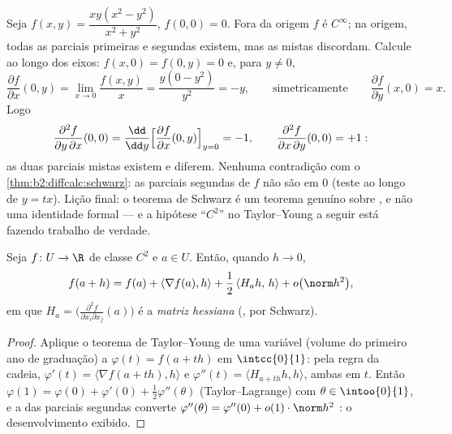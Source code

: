 \begin{example}\label{ex:b2:diffcalc:peano}
Seja $f(x, y) = \dfrac{xy(x^2 - y^2)}{x^2 + y^2}$, $f(0,0) = 0$.
Fora da origem $f$ é $C^\infty$; na origem, todas as parciais primeiras
e segundas existem, mas as mistas discordam. Calcule
ao longo dos eixos: $f(x, 0) = f(0, y) = 0$ e, para $y \neq 0$,
\[
\frac{\partial f}{\partial x}(0, y)
= \lim_{x\to0}\frac{f(x,y)}{x}
= \frac{y(0 - y^2)}{y^2} = -y ,
\qquad\text{simetricamente}\qquad
\frac{\partial f}{\partial y}(x, 0) = x .
\]
Logo
\[
\frac{\partial^2 f}{\partial y\,\partial x}(0,0)
= \frac{\dd}{\dd y}\Bigl[\frac{\partial f}{\partial
x}(0,y)\Bigr]_{y=0} = -1,
\qquad
\frac{\partial^2 f}{\partial x\,\partial y}(0,0) = +1 :
\]
as duas parciais mistas existem e diferem. Nenhuma contradição com o
\cref{thm:b2:diffcalc:schwarz}: as parciais segundas de $f$ não são
 em $0$ (teste ao longo de $y = tx$). Lição final:
o teorema de Schwarz é um teorema genuíno sobre \emph{},
e não uma identidade formal --- e a hipótese ``$C^2$'' no
Taylor--Young a seguir está fazendo trabalho de verdade.
\end{example}

\begin{theorem}\label{thm:b2:diffcalc:taylor}
Seja $f \colon U \to \R$ de classe $C^2$ e $a \in U$. Então, quando $h \to 0$,
\[
f(a + h) = f(a) + \langle\nabla f(a), h\rangle
+ \frac12\, \langle H_a h,\, h\rangle + o\bigl(\norm h^2\bigr),
\]
em que $H_a = \bigl(\frac{\partial^2 f}{\partial x_i\partial
x_j}(a)\bigr)$ é a \emph{matriz hessiana}
(, por Schwarz).
\end{theorem}

\begin{proof}
Aplique o teorema de Taylor--Young de uma variável (volume do primeiro ano de graduação) a
$\varphi(t) = f(a + th)$ em $\intcc{0}{1}$: pela regra da cadeia,
$\varphi'(t) = \langle \nabla f(a + th), h\rangle$ e $\varphi''(t)
= \langle H_{a+th}h, h\rangle$, ambas  em $t$. Então
$\varphi(1) = \varphi(0) + \varphi'(0) + \frac12\varphi''(\theta)$
(Taylor--Lagrange) com $\theta \in \intoo{0}{1}$, e a 
das parciais segundas converte $\varphi''(\theta) =
\varphi''(0) + o(1)\cdot\norm h^2$ : o
desenvolvimento exibido.
\end{proof}

